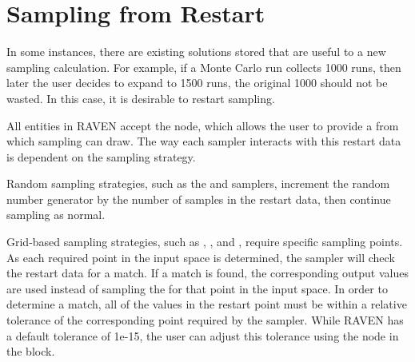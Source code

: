 \section{Sampling from Restart}
\label{sec:samplingFromRestart}
In some instances, there are existing solutions stored that are useful to a new sampling calculation.  For
example, if a Monte Carlo run collects 1000 runs, then later the user decides to expand to 1500 runs, the
original 1000 should not be wasted.  In this case, it is desirable to restart sampling.

All  entities in RAVEN accept the  node, which allows the user to provide a
 from which sampling can draw.  The way each sampler interacts with this restart data is
dependent on the sampling strategy.

Random sampling strategies, such as the  and  samplers, increment the
random number generator by the number of samples in the restart data, then continue sampling as normal.

Grid-based sampling strategies, such as , , and ,
require specific sampling points.  As each required point in the input space is determined, the sampler will 
check the restart data for a match.  If a match is found, the corresponding output values are used instead of 
sampling the  for that point in the input space.  In order to determine a match, all of the
values in the restart point must be within a relative tolerance of the corresponding point required by the
sampler.  While RAVEN has a default tolerance of 1e-15, the user can adjust this tolerance using the
 node in the  block.

